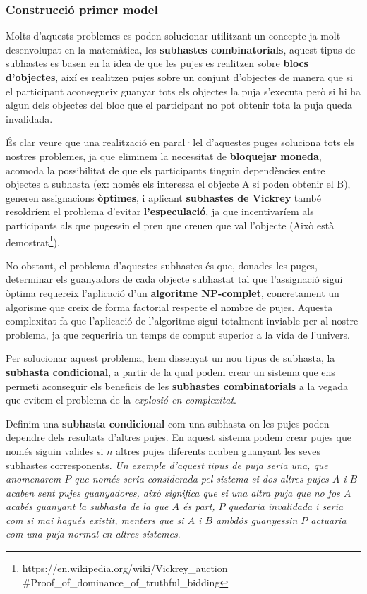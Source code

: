 \documentclass[10pt,twocolumn]{article}
\begin{document}
\subsubsection{Construcció primer model}

Molts d'aquests problemes es poden solucionar utilitzant un concepte ja molt desenvolupat en la matemàtica, les \textbf{subhastes combinatorials}\cite{CA}, aquest tipus de subhastes es basen en la idea de que les pujes es realitzen sobre \textbf{blocs d'objectes}, així es realitzen pujes sobre un conjunt d'objectes de manera que si el participant aconsegueix guanyar tots els objectes la puja s'executa però si hi ha algun dels objectes del bloc que el participant no pot obtenir tota la puja queda invalidada.

És clar veure que una realització en paral·lel d'aquestes puges soluciona tots els nostres problemes, ja que eliminem la necessitat de \textbf{bloquejar moneda}, acomoda la possibilitat de que els participants tinguin dependències entre objectes a subhasta (ex: només els interessa el objecte A si poden obtenir el B), generen assignacions \textbf{òptimes}, i aplicant \textbf{subhastes de Vickrey} també resoldríem el problema d'evitar \textbf{l'especulació}, ja que incentivaríem als participants als  que pugessin el preu que creuen que val l'objecte (Això està demostrat\footnote{https://en.wikipedia.org/wiki/Vickrey\_auction \\
	\#Proof\_of\_dominance\_of\_truthful\_bidding}).

No obstant, el problema d'aquestes subhastes és que, donades les puges, determinar els guanyadors de cada objecte subhastat tal que l'assignació sigui òptima requereix l'aplicació d'un \textbf{algoritme NP-complet}, concretament un algorisme que creix de forma factorial respecte el nombre de pujes. Aquesta complexitat fa que l'aplicació de l'algoritme sigui totalment inviable per al nostre problema, ja que requeriria un temps de comput superior a la vida de l'univers.

Per solucionar aquest problema, hem dissenyat un nou tipus de subhasta, la \textbf{subhasta condicional}, a partir de la qual podem crear un sistema que ens permeti aconseguir els beneficis de les \textbf{subhastes combinatorials} a la vegada que evitem el problema de la \textit{explosió en complexitat}.

Definim una \textbf{subhasta condicional} com una subhasta on les pujes poden dependre dels resultats d'altres pujes. En aquest sistema podem crear pujes que només siguin valides si $n$ altres pujes diferents acaben guanyant les seves subhastes corresponents. \textit{Un exemple d'aquest tipus de puja seria una, que anomenarem $P$ que només seria considerada pel sistema si dos altres pujes $A$ i $B$ acaben sent pujes guanyadores, això significa que si una altra puja que no fos $A$ acabés guanyant la subhasta de la que $A$ és part, $P$ quedaria invalidada i seria com si mai hagués existit, menters que si $A$ i $B$ ambdós guanyessin $P$ actuaria com una puja normal en altres sistemes}.
\end{document}
